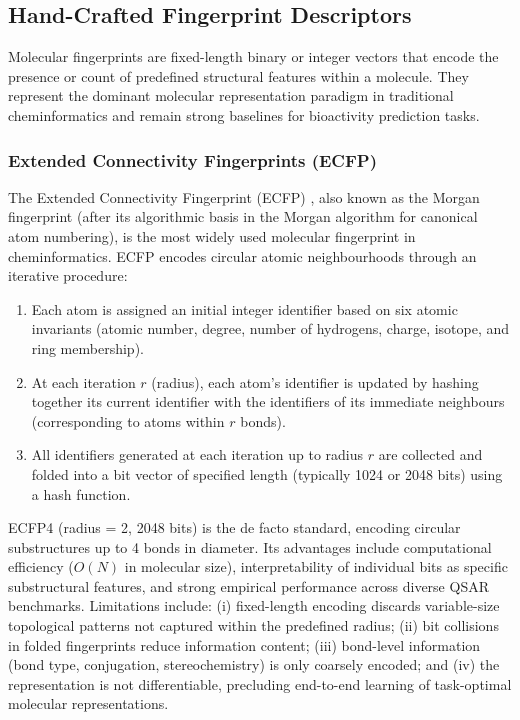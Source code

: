 \subsection{Hand-Crafted Fingerprint Descriptors}

Molecular fingerprints are fixed-length binary or integer vectors that encode
the presence or count of predefined structural features within a molecule.
They represent the dominant molecular representation paradigm in traditional
cheminformatics and remain strong baselines for bioactivity prediction tasks.

\subsubsection{Extended Connectivity Fingerprints (ECFP)}

The Extended Connectivity Fingerprint (ECFP) \parencite{rogers2010ecfp}, also
known as the Morgan fingerprint (after its algorithmic basis in the Morgan
algorithm for canonical atom numbering), is the most widely used molecular
fingerprint in cheminformatics. ECFP encodes circular atomic neighbourhoods
through an iterative procedure:

\begin{enumerate}
    \item Each atom is assigned an initial integer identifier based on six atomic
    invariants (atomic number, degree, number of hydrogens, charge, isotope,
    and ring membership).
    \item At each iteration $r$ (radius), each atom's identifier is updated by
    hashing together its current identifier with the identifiers of its immediate
    neighbours (corresponding to atoms within $r$ bonds).
    \item All identifiers generated at each iteration up to radius $r$ are
    collected and folded into a bit vector of specified length (typically 1024
    or 2048 bits) using a hash function.
\end{enumerate}

ECFP4 (radius = 2, 2048 bits) is the de facto standard, encoding circular
substructures up to 4 bonds in diameter. Its advantages include computational
efficiency ($O(N)$ in molecular size), interpretability of individual bits as
specific substructural features, and strong empirical performance across diverse
QSAR benchmarks. Limitations include: (i) fixed-length encoding discards
variable-size topological patterns not captured within the predefined radius;
(ii) bit collisions in folded fingerprints reduce information content;
(iii) bond-level information (bond type, conjugation, stereochemistry) is only
coarsely encoded; and (iv) the representation is not differentiable, precluding
end-to-end learning of task-optimal molecular representations.

